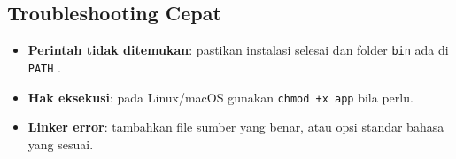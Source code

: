 \documentclass[../main.tex]{subfiles}
\begin{document}
\subsection{Troubleshooting Cepat}
\begin{itemize}
  \item \textbf{Perintah tidak ditemukan}: pastikan instalasi selesai dan folder \texttt{bin} ada di \texttt{PATH} \parencite{gcc-docs,clang-docs,free-pascal-docs}.
  \item \textbf{Hak eksekusi}: pada Linux/macOS gunakan \texttt{chmod +x app} bila perlu.
  \item \textbf{Linker error}: tambahkan file sumber yang benar, atau opsi standar bahasa yang sesuai.
\end{itemize}
\end{document}
